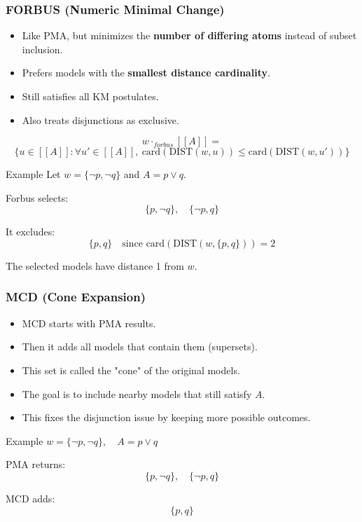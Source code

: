 \documentclass{beamer}
\begin{document}
\begin{frame}
\frametitle{FORBUS (Numeric Minimal Change)}
\begin{itemize}
    \item Like PMA, but minimizes the \textbf{number of differing atoms} instead of subset inclusion.
    \item Prefers models with the \textbf{smallest distance cardinality}.
    \item Still satisfies all KM postulates.
    \item Also treats disjunctions as exclusive.
\end{itemize}
\pause
\[
w \cdot_{forbus} [[A]] = 
\]
\[
\{ u \in [[A]] : \forall u' \in [[A]],\ \text{card}(\text{DIST}(w, u)) \leq \text{card}(\text{DIST}(w, u')) \}
\]
\pause
\small
\begin{block}{Example}
Let $w = \{\neg p, \neg q\}$ and $A = p \lor q$.

Forbus selects:
\[
\{p, \neg q\}, \quad \{\neg p, q\}
\]

It excludes:
\[
\{p, q\} \quad \text{since } \text{card}(\text{DIST}(w, \{p, q\})) = 2
\]

The selected models have distance 1 from $w$.
\end{block}
\end{frame}

\begin{frame}
\frametitle{MCD (Cone Expansion)}
\begin{itemize}
    \item MCD starts with PMA results.
    \item Then it adds all models that contain them (supersets).
    \item This set is called the "cone" of the original models.
    \item The goal is to include nearby models that still satisfy $A$.
    \item This fixes the disjunction issue by keeping more possible outcomes.
\end{itemize}
\pause
\begin{block}{Example}
$w = \{\neg p, \neg q\},\quad A = p \lor q$

PMA returns:
\[
\{p, \neg q\}, \quad \{\neg p, q\}
\]

MCD adds:
\[
\{p, q\}
\]
\end{block}
\end{frame}
\end{document}

